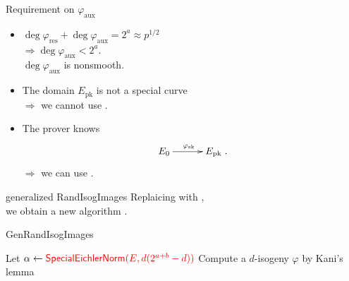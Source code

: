 \begin{frame}{Requirement on $\varphi_\mathrm{aux}$}
    \begin{itemize}
        \setlength{\itemsep}{10pt}
        \item $\deg\varphi_\mathrm{res} + \deg\varphi_\mathrm{aux} = 2^a \approx p^{1/2}$\\[3pt]
            $\Rightarrow \deg\varphi_\mathrm{aux} < 2^a$.\\[3pt]
            \hphantom{$\Rightarrow$} $\deg\varphi_\mathrm{aux}$ is nonsmooth.
        \item The domain $E_\mathrm{pk}$ is not a special curve\\[3pt]
            $\Rightarrow$ we cannot use .
        \item The prover knows
                \begin{align*}
                    \xymatrix@C=30pt{
                        E_0 \ar[r]^{\varphi_\mathrm{sk}} & E_\mathrm{pk}
                    }.
                \end{align*}
            $\Rightarrow$ we can use .
    \end{itemize}

\end{frame}

\begin{frame}{generalized RandIsogImages}
    Replaicing  with ,\\
    we obtain a new algorithm .

    \vspace{10pt}
    \begin{algorithm}[H]
        \caption{\textsf{GenRandIsogImages}}
        \BlankLine
        Let $\alpha \leftarrow \textcolor{red}{\textsf{SpecialEichlerNorm}(E, d(2^{a+b} - d))}$\;
        Compute a $d$-isogeny $\varphi$ by Kani's lemma\;
        \Return{$\varphi$}\;
    \end{algorithm}
\end{frame}

